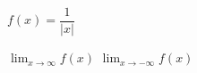\noindent\begin{minipage}[t]{0.58\linewidth}\vspace{0pt}\raggedright $f(x)=\dfrac{1}{|x|}$\end{minipage}\hfill\begin{minipage}[t]{0.4\linewidth}\vspace{0pt}\centering \resizebox{\ifdim\width>\linewidth\linewidth\else\width\fi}{!}{}\end{minipage}\par
{} $\displaystyle\lim_{x\to\infty} f(x)$
 $\displaystyle\lim_{x\to-\infty} f(x)$
